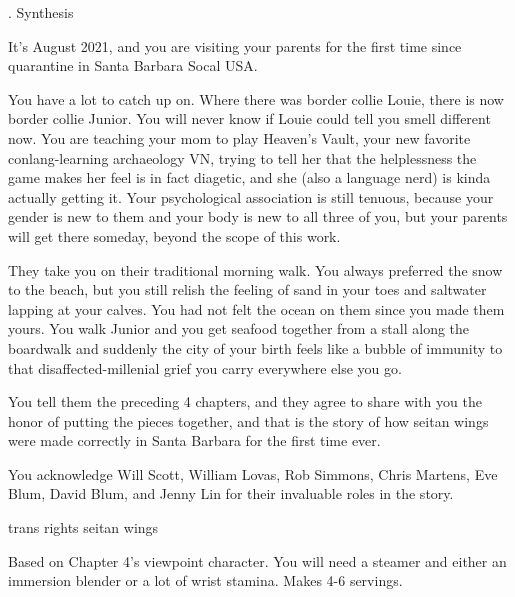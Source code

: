 \documentclass[12pt]{article}
\newcommand\chapter[2]{{\thispagestyle{empty} \Large \sc #1. \quad #2

\vspace{1.5em}}}
\begin{document}
\newpage \thispagestyle{empty}

\chapter{5}{Synthesis}

It's August 2021, and you are visiting your parents for the first time since quarantine in Santa Barbara Socal USA.

You have a lot to catch up on.
Where there was border collie Louie, there is now border collie Junior.
You will never know if Louie could tell you smell different now.
You are teaching your mom to play Heaven's Vault,
your new favorite conlang-learning archaeology VN,
trying to tell her that the helplessness the game makes her feel is in fact diagetic,
and she (also a language nerd) is kinda actually getting it.
%
Your psychological association is still tenuous,
because your gender is new to them and your body is new to all three of you,
but your parents will get there someday, beyond the scope of this work.

They take you on their traditional morning walk. %
You always preferred the snow to the beach,
but you still relish the feeling of sand in your toes and saltwater lapping at your calves.
You had not felt the ocean on them since you made them yours.
You walk Junior and you get seafood together from a stall along the boardwalk
and suddenly the city of your birth feels like a bubble of immunity to that disaffected-millenial grief you carry everywhere else you go.

You tell them the preceding 4 chapters,
and they agree to share with you the honor of putting the pieces together,
and that is the story of how seitan wings were made correctly in Santa Barbara for the first time ever.

\vspace{15em}

\noindent You acknowledge Will Scott, William Lovas, Rob Simmons, Chris Martens, Eve Blum, David Blum, and Jenny Lin for their invaluable roles in the story.

\newpage \thispagestyle{empty}

\begin{center}
	{\sc \Large trans rights seitan wings}
\end{center}

Based on Chapter 4's viewpoint character.
You will need a steamer and either an immersion blender or a lot of wrist stamina.
Makes 4-6 servings.
\end{document}
